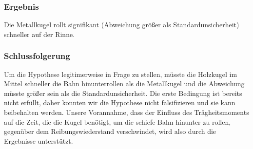 \documentclass[
	a4paper,
	12pt,
	pagesize,
	ngerman
]{scrartcl}
\begin{document}
	\subsubsection{Ergebnis}
	Die Metallkugel rollt signifikant (Abweichung größer als Standardunsicherheit) schneller auf der Rinne.
	\subsubsection{Schlussfolgerung}
	Um die Hypothese legitimerweise in Frage zu stellen, müsste die Holzkugel im Mittel schneller die Bahn hinunterrollen als die Metallkugel und die Abweichung müsste größer sein als die Standardunsicherheit. Die erste Bedingung ist bereits nicht erfüllt, daher konnten wir die Hypothese nicht falsifizieren und sie kann beibehalten werden. Unsere Vorannahme, dass der Einfluss des Trägheitsmoments auf die Zeit, die die Kugel benötigt, um die schiefe Bahn hinunter zu rollen, gegenüber dem Reibungswiederstand verschwindet, wird also durch die Ergebnisse unterstützt.
	
	
\end{document}
